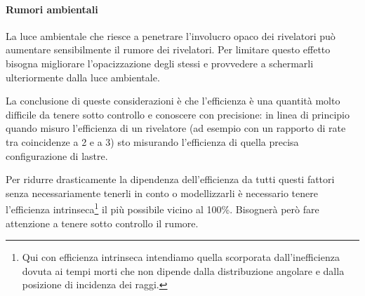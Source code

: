 \paragraph{Rumori ambientali}
La luce ambientale che riesce a penetrare l'involucro opaco dei rivelatori può aumentare sensibilmente il rumore dei rivelatori. Per limitare questo effetto bisogna migliorare l'opacizzazione degli stessi e provvedere a schermarli ulteriormente dalla luce ambientale.

La conclusione di queste considerazioni è che l'efficienza è una quantità molto difficile da tenere sotto controllo e conoscere con precisione: in linea di principio quando misuro l'efficienza di un rivelatore (ad esempio con un rapporto di rate tra coincidenze  a 2 e a 3) sto misurando l'efficienza di quella precisa configurazione di lastre.

Per ridurre drasticamente la dipendenza dell'efficienza da tutti questi fattori senza necessariamente tenerli in conto o modellizzarli è necessario tenere l'efficienza intrinseca\footnote{Qui con efficienza intrinseca intendiamo quella scorporata dall'inefficienza dovuta ai tempi morti che non dipende dalla distribuzione angolare e dalla posizione di incidenza dei raggi.} il più possibile vicino al 100\%. Bisognerà però fare attenzione a tenere sotto controllo il rumore.
 
 